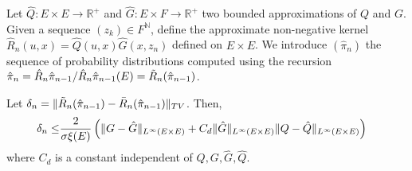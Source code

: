 Let $\hat Q : E \times E\to\mathbb R^+$ and $\hat G: E \times F \to \mathbb R^+$ two bounded approximations of $Q$ and $G$. Given a sequence $(z_k)\in F^\mathbb N$, define the approximate non-negative kernel $\hat R_n(u, x) = \hat Q(u, x)\hat G(x, z_n)$ defined on $E\times E$. We introduce $(\hat\pi_n)$ the sequence of probability distributions computed using the recursion $\hat \pi_{n} = \hat R_n\hat\pi_{n-1}/\hat R_n\hat\pi_{n-1}(E)=\tilde{{R}}_n(\hat\pi_{n-1})$.

\begin{proposition}\label{prop:bound-delta-n}
Let $\delta_n = \Vert \tilde{{R}}_n(\hat\pi_{n-1}) - \bar R_n(\hat\pi_{n-1})\Vert_{TV}$. Then,
\begin{align}
    \delta_n \leq & \frac{2}{\sigma\xi(E)}\left(\Vert G-\hat G\Vert_{L^\infty(E\times E)} + C_d\Vert \hat G\Vert_{L^\infty(E\times E)}\Vert Q-\hat Q\Vert_{L^\infty(E\times E)}\right)
\end{align}
where $C_d$ is a constant independent of $Q, G,\hat G, \hat Q$.
\end{proposition}


